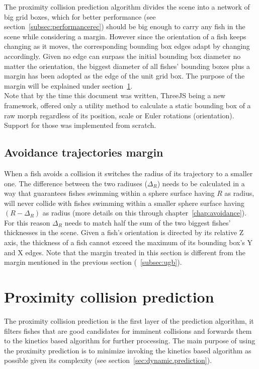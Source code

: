 The proximity collision prediction algorithm divides the scene into a network of big grid boxes, which for better performance (see section~\ref{subsec:performancerec}) should be big enough to carry any fish in the scene while considering a margin. However since the orientation of a fish keeps changing as it moves, the corresponding bounding box edges adapt by changing accordingly. Given no edge can surpass the initial bounding box diameter no matter the orientation, the biggest diameter of all fishes' bounding boxes plus a margin has been adopted as the edge of the unit grid box. The purpose of the margin will be explained under section~\ref{sec:static.prediction}.\\

Note that by the time this document was written, ThreeJS being a new framework, offered only a utility method to calculate a static bounding box of a raw morph regardless of its position, scale or Euler rotations (orientation). Support for those was implemented from scratch.

\subsection{Avoidance trajectories margin}
\label{subsec:avoidance-margin}

When a fish avoids a collision it switches the radius of its trajectory to a smaller one. The difference between the two radiuses ($\Delta_{R}$) needs to be calculated in a way that guarantees fishes swimming within a sphere surface having $R$ as radius, will never collide with fishes swimming within a smaller sphere surface having $(R-\Delta_{R})$ as radius (more details on this through chapter~\ref{chap:avoidance}). For this reason $\Delta_{R}$ needs to match half the sum of the two biggest fishes' thicknesses in the scene. Given a fish's orientation is directed by its relative Z axis, the thickness of a fish cannot exceed the maximum of its bounding box's Y and X edges. Note that the margin treated in this section is different from the margin mentioned in the previous section (~\ref{subsec:ugb}).

\section{Proximity collision prediction}
\label{sec:static.prediction}

The proximity collision prediction is the first layer of the prediction algorithm, it filters fishes that are good candidates for imminent collisions and forwards them to the kinetics based algorithm for further processing. The main purpose of using the proximity prediction is to minimize invoking the kinetics based algorithm as possible given its complexity (see section~\ref{sec:dynamic.prediction}).\\


